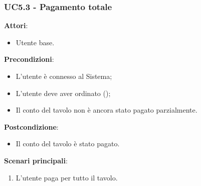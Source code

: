 \subsubsection{UC5.3 - Pagamento totale}\label{usecase:5.3}
\textbf{Attori}:
\begin{itemize}
    \item Utente base.
\end{itemize}
\textbf{Precondizioni}:
\begin{itemize}
    \item L'utente è connesso al Sistema;
    \item L'utente deve aver ordinato ();
    \item Il conto del tavolo non è ancora stato pagato parzialmente.
\end{itemize}
\textbf{Postcondizione}:
\begin{itemize}
    \item Il conto del tavolo è stato pagato.
\end{itemize}
\textbf{Scenari principali}:
\begin{enumerate}
    \item L'utente paga per tutto il tavolo.
\end{enumerate}